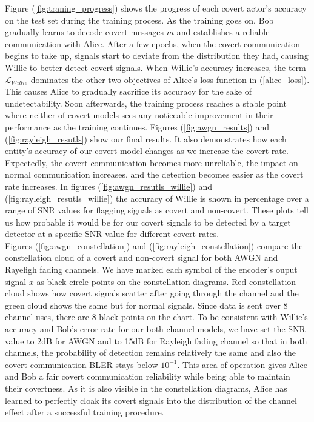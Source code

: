 Figure (\ref{fig:traning_progress}) shows the progress of each covert actor's accuracy on the test set during the training process. As the training goes on, Bob gradually learns to decode covert messages \(m\) and establishes a reliable communication with Alice. After a few epochs, when the covert communication begins to take up, signals start to deviate from the distribution they had, causing Willie to better detect covert signals. When Willie's accuracy increases, the term \(\mathcal{L}_{Willie}\) dominates the other two objectives of Alice's loss function in (\ref{alice_loss}). This causes Alice to gradually sacrifice its accuracy for the sake of undetectability. Soon afterwards, the training process reaches a stable point where neither of covert models sees any noticeable improvement in their performance as the training continues. Figures (\ref{fig:awgn_results}) and (\ref{fig:rayleigh_resutls}) show our final results. It also demonstrates how each entity's accuracy of our covert model changes as we increase the covert rate. Expectedly, the covert communication becomes more unreliable, the impact on normal communication increases, and the detection becomes easier as the covert rate increases. In figures (\ref{fig:awgn_resutls_willie}) and (\ref{fig:rayleigh_resutls_willie}) the accuracy of Willie is shown in percentage over a range of SNR values for flagging signals as covert and non-covert. These plots tell us how probable it would be for our covert signals to be detected by a target detector at a specific SNR value for different covert rates.\\
Figures (\ref{fig:awgn_constellation}) and (\ref{fig:rayleigh_constellation}) compare the constellation cloud of a covert and non-covert signal for both AWGN and Rayeligh fading channels. We have marked each symbol of the encoder's ouput signal \(x\) as black circle points on the constellation diagrams. Red constellation cloud shows how covert signals scatter after going through the channel and the green cloud shows the same but for normal signals. Since data is sent over 8 channel uses, there are 8 black points on the chart. To be consistent with Willie's accuracy and Bob's error rate for our both channel models, we have set the SNR value to 2dB for AWGN and to 15dB for Rayleigh fading channel so that in both channels, the probability of detection remains relatively the same and also the covert communication BLER stays below \(10^{-1}\). This area of operation gives Alice and Bob a fair covert communication reliability while being able to maintain their covertness. As it is also visible in the constellation diagrams, Alice has learned to perfectly cloak its covert signals into the distribution of the channel effect after a successful training procedure.
